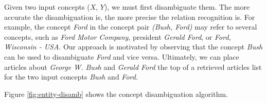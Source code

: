 
Given two input concepts ($X$, $Y$), we must first disambiguate
them. The more accurate the disambiguation is, the more precise the
relation recognition is. For example, the concept \emph{Ford} in the
concept pair \emph{(Bush, Ford)} may refer to several concepts, such
as \emph{Ford Motor Company}, president \emph{Gerald Ford}, or
\emph{Ford, Wisconsin - USA}. Our approach is motivated by observing
that the concept \emph{Bush} can be used to disambiguate \emph{Ford}
and vice versa. Ultimately, we can place articles about \emph{George
  W. Bush} and \emph{Gerald Ford} the top of a retrieved articles list
for the two input concepts \emph{Bush} and \emph{Ford}.

Figure \ref{fig:entity-disamb} shows the concept disambiguation
algorithm. 

